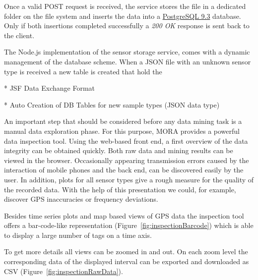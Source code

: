 \documentclass[times, 10pt,twocolumn]{article}
\begin{document}
Once a valid POST request is received, the service stores the file in a dedicated folder on the file system and inserts the data into a \href{http://www.postgresql.org/}{PostgreSQL 9.3} database.
Only if both insertions completed successfully a {\em 200 OK} response is sent back to the client.

The Node.js implementation of the sensor storage service, comes with a dynamic management of the database scheme.
When a JSON file with an unknown sensor type is received a new table is created that hold the 

* JSF Data Exchange Format

* Auto Creation of DB Tables for new sample types (JSON data type)


An important step that should be considered before any data mining task is a manual data exploration phase.
For this purpose, MORA provides a powerful data inspection tool.
Using the web-based front end, a first overview of the data integrity can be obtained quickly.
Both raw data and mining results can be viewed in the browser.
Occasionally appearing transmission errors caused by the interaction of mobile phones and the back end, can be discovered easily by the user.
In addition, plots for all sensor types give a rough measure for the quality of the recorded data.
With the help of this presentation we could, for example, discover GPS inaccuracies or frequency deviations.

Besides time series plots and map based views of GPS data the inspection tool offers a bar-code-like representation (Figure~\ref{fig:inspectionBarcode}) which is able to display a large number of tags on a time axis.

To get more details all views can be zoomed in and out.
On each zoom level the corresponding data of the displayed interval can be exported and downloaded as CSV (Figure~\ref{fig:inspectionRawData}).
\end{document}
